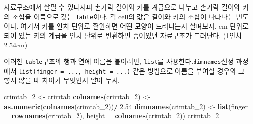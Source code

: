\documentclass[
]{article}
\newenvironment{Shaded}{\begin{snugshade}}{\end{snugshade}}
\newcommand{\DataTypeTok}[1]{\textcolor[rgb]{0.13,0.29,0.53}{#1}}
\newcommand{\DecValTok}[1]{\textcolor[rgb]{0.00,0.00,0.81}{#1}}
\newcommand{\FloatTok}[1]{\textcolor[rgb]{0.00,0.00,0.81}{#1}}
\newcommand{\KeywordTok}[1]{\textcolor[rgb]{0.13,0.29,0.53}{\textbf{#1}}}
\newcommand{\NormalTok}[1]{#1}
\newcommand{\OperatorTok}[1]{\textcolor[rgb]{0.81,0.36,0.00}{\textbf{#1}}}
\newcommand{\StringTok}[1]{\textcolor[rgb]{0.31,0.60,0.02}{#1}}
\begin{document}
자료구조에서 살필 수 있다시피 손가락 길이와 키를 계급으로 나누고 손가락
길이와 키의 조합을 이름으로 갖는 \texttt{table}이다. 각 cell의 값은
길이와 키의 조합이 나타나는 빈도이다. 여기서 키를 인치 단위로 환원하면
어떤 모양이 드러나는지 살펴보자. cm 단위로 되어 있는 키의 계급을 인치
단위로 변환하면 숨어있던 자료구조가 드러난다. (1인치 = 2.54cm)

이러한 \texttt{table}구조의 행과 열에 이름을 붙이려면, \texttt{list}를
사용한다.\texttt{dimnames}설정 과정에서
\texttt{list(finger\ =\ ...,\ height\ =\ ...)} 같은 방법으로 이름을
부여할 경우와 그렇지 않을 때 차이가 무엇인지 알아 두자.

\begin{Shaded}
\begin{Highlighting}[]
\NormalTok{crimtab_}\DecValTok{2}\NormalTok{ <-}\StringTok{ }\NormalTok{crimtab}
\KeywordTok{colnames}\NormalTok{(crimtab_}\DecValTok{2}\NormalTok{) <-}\StringTok{ }\KeywordTok{as.numeric}\NormalTok{(}\KeywordTok{colnames}\NormalTok{(crimtab_}\DecValTok{2}\NormalTok{))}\OperatorTok{/}\StringTok{ }\FloatTok{2.54}
\KeywordTok{dimnames}\NormalTok{(crimtab_}\DecValTok{2}\NormalTok{) <-}\StringTok{ }\KeywordTok{list}\NormalTok{(}\DataTypeTok{finger =} \KeywordTok{rownames}\NormalTok{(crimtab_}\DecValTok{2}\NormalTok{), }
                            \DataTypeTok{height =} \KeywordTok{colnames}\NormalTok{(crimtab_}\DecValTok{2}\NormalTok{))}
\NormalTok{crimtab_}\DecValTok{2}
\end{Highlighting}
\end{Shaded}
\end{document}
